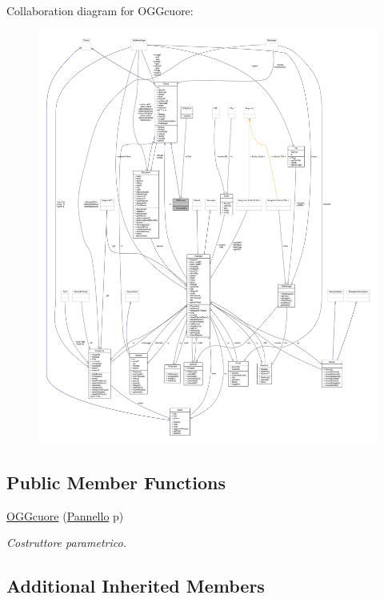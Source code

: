 Collaboration diagram for O\+G\+Gcuore\+:
\nopagebreak
\begin{figure}[H]
\begin{center}
\leavevmode
\includegraphics[width=350pt]{classoggetti_1_1_o_g_gcuore__coll__graph}
\end{center}
\end{figure}
\subsection*{Public Member Functions}
\begin{DoxyCompactItemize}
\item 
\hyperlink{classoggetti_1_1_o_g_gcuore_a0107b552779c819ca78b66c4689e8b75}{O\+G\+Gcuore} (\hyperlink{classa_1_1survival_1_1game_1_1_pannello}{Pannello} p)
\begin{DoxyCompactList}\small\item\em Costruttore parametrico. \end{DoxyCompactList}\end{DoxyCompactItemize}
\subsection*{Additional Inherited Members}


